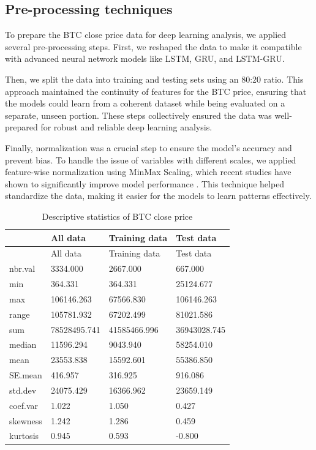 \documentclass[]{interact}
\theoremstyle{plain}%
\theoremstyle{definition}
\theoremstyle{remark}
\begin{document}
\subsection{Pre-processing techniques}\label{pre-processing-techniques}

To prepare the BTC close price data for deep learning analysis, we
applied several pre-processing steps. First, we reshaped the data to
make it compatible with advanced neural network models like LSTM, GRU,
and LSTM-GRU.

Then, we split the data into training and testing sets using an 80:20
ratio. This approach maintained the continuity of features for the BTC
price, ensuring that the models could learn from a coherent dataset
while being evaluated on a separate, unseen portion. These steps
collectively ensured the data was well-prepared for robust and reliable
deep learning analysis.

Finally, normalization was a crucial step to ensure the model's accuracy
and prevent bias. To handle the issue of variables with different
scales, we applied feature-wise normalization using MinMax Scaling,
which recent studies have shown to significantly improve model
performance \citep{ahsan2021}. This technique helped standardize the
data, making it easier for the models to learn patterns effectively.

\begin{longtable}[]{@{}llll@{}}
\caption{Descriptive statistics of BTC close price}\tabularnewline
\toprule\noalign{}
& All data & Training data & Test data \\
\midrule\noalign{}
\endfirsthead
\toprule\noalign{}
& All data & Training data & Test data \\
\midrule\noalign{}
\endhead
\bottomrule\noalign{}
\endlastfoot
nbr.val & 3334.000 & 2667.000 & 667.000 \\
min & 364.331 & 364.331 & 25124.677 \\
max & 106146.263 & 67566.830 & 106146.263 \\
range & 105781.932 & 67202.499 & 81021.586 \\
sum & 78528495.741 & 41585466.996 & 36943028.745 \\
median & 11596.294 & 9043.940 & 58254.010 \\
mean & 23553.838 & 15592.601 & 55386.850 \\
SE.mean & 416.957 & 316.925 & 916.086 \\
std.dev & 24075.429 & 16366.962 & 23659.149 \\
coef.var & 1.022 & 1.050 & 0.427 \\
skewness & 1.242 & 1.286 & 0.459 \\
kurtosis & 0.945 & 0.593 & -0.800 \\
\end{longtable}
\end{document}
